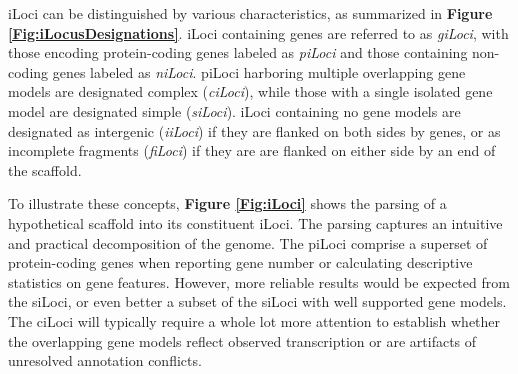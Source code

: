 iLoci can be distinguished by various characteristics, as summarized in \textbf{Figure \ref{Fig:iLocusDesignations}}.
iLoci containing genes are referred to as \textit{giLoci}, with those encoding protein-coding genes labeled as \textit{piLoci} and those containing non-coding genes labeled as \textit{niLoci}.
piLoci harboring multiple overlapping gene models are designated complex (\textit{ciLoci}), while those with a single isolated gene model are designated simple (\textit{siLoci}).
iLoci containing no gene models are designated as intergenic (\textit{iiLoci}) if they are flanked on both sides by genes, or as incomplete fragments (\textit{fiLoci}) if they are are flanked on either side by an end of the scaffold.

To illustrate these concepts, \textbf{Figure \ref{Fig:iLoci}} shows the parsing of a hypothetical scaffold into its constituent iLoci.
The parsing captures an intuitive and practical decomposition of the genome.
The piLoci comprise a superset of protein-coding genes when reporting gene number or calculating descriptive statistics on gene features.
However, more reliable results would be expected from the siLoci, or even better a subset of the siLoci with well supported gene models.
The ciLoci will typically require a whole lot more attention to establish whether the overlapping gene models reflect observed transcription or are artifacts of unresolved annotation conflicts.


